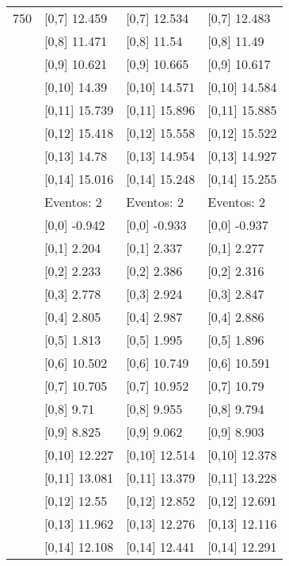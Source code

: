 \begin{table}
\begin{tabular}[t]{llll}
750 & {}[0,7] 12.459 & {}[0,7] 12.534 & {}[0,7] 12.483\\
\addlinespace
 & {}[0,8] 11.471 & {}[0,8] 11.54 & {}[0,8] 11.49\\
 & {}[0,9] 10.621 & {}[0,9] 10.665 & {}[0,9] 10.617\\
 & {}[0,10] 14.39 & {}[0,10] 14.571 & {}[0,10] 14.584\\
 & {}[0,11] 15.739 & {}[0,11] 15.896 & {}[0,11] 15.885\\
 & {}[0,12] 15.418 & {}[0,12] 15.558 & {}[0,12] 15.522\\
\addlinespace
 & {}[0,13] 14.78 & {}[0,13] 14.954 & {}[0,13] 14.927\\
 & {}[0,14] 15.016 & {}[0,14] 15.248 & {}[0,14] 15.255\\
 & Eventos:  2 & Eventos:  2 & Eventos:  2\\
 & {}[0,0] -0.942 & {}[0,0] -0.933 & {}[0,0] -0.937\\
 & {}[0,1] 2.204 & {}[0,1] 2.337 & {}[0,1] 2.277\\
\addlinespace
 & {}[0,2] 2.233 & {}[0,2] 2.386 & {}[0,2] 2.316\\
 & {}[0,3] 2.778 & {}[0,3] 2.924 & {}[0,3] 2.847\\
 & {}[0,4] 2.805 & {}[0,4] 2.987 & {}[0,4] 2.886\\
 & {}[0,5] 1.813 & {}[0,5] 1.995 & {}[0,5] 1.896\\
 & {}[0,6] 10.502 & {}[0,6] 10.749 & {}[0,6] 10.591\\
\addlinespace
1000 & {}[0,7] 10.705 & {}[0,7] 10.952 & {}[0,7] 10.79\\
 & {}[0,8] 9.71 & {}[0,8] 9.955 & {}[0,8] 9.794\\
 & {}[0,9] 8.825 & {}[0,9] 9.062 & {}[0,9] 8.903\\
 & {}[0,10] 12.227 & {}[0,10] 12.514 & {}[0,10] 12.378\\
 & {}[0,11] 13.081 & {}[0,11] 13.379 & {}[0,11] 13.228\\
\addlinespace
 & {}[0,12] 12.55 & {}[0,12] 12.852 & {}[0,12] 12.691\\
 & {}[0,13] 11.962 & {}[0,13] 12.276 & {}[0,13] 12.116\\
 & {}[0,14] 12.108 & {}[0,14] 12.441 & {}[0,14] 12.291\\
\bottomrule
\end{tabular}
\end{table}
